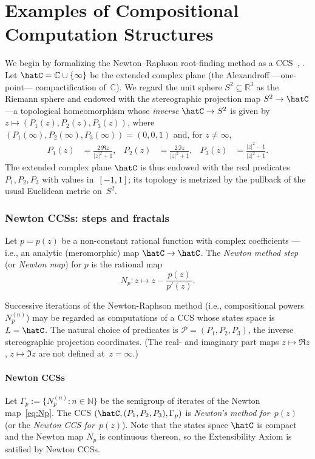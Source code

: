 
\section{Examples of Compositional Computation Structures}\label{sec:examples_CSS}

We begin by formalizing the Newton--Raphson root-finding method as a CCS~\cite{Galantai200025}, \cite[Section~2.3]{Burden2016numerical}.
Let $\hatC = \mathbb{C}\cup\{\infty\}$ be the extended complex plane (the Alexandroff —one-point— compactification of~$\mathbb{C}$).
We regard the unit sphere $S^2\subseteq \mathbb{R}^3$ as the Riemann sphere and endowed with the stereographic projection map $S^2\to\hatC$ —a topological homeomorphism whose \emph{inverse} $\hatC\rightarrow S^2$ is given by $z \mapsto (P_1(z), P_2(z), P_3(z))$, where $(P_1(\infty), P_2(\infty), P_3(\infty)) = (0,0,1)$ and, for $z\ne\infty$,
    \begin{align*}
        P_1(z) &= \frac{2\,\Re{z}}{|z|^2+1},&
        P_2(z) &= \frac{2\,\Im{z}}{|z|^2+1},&
        P_3(z) &= \frac{|z|^2-1}{|z|^2+1}.
    \end{align*}
The extended complex plane $\hatC$ is thus endowed with the real predicates $P_1, P_2, P_3$ with values in~$[-1,1]$; its topology is metrized by the pullback of the usual Euclidean metric on~$S^2$.

\subsubsection*{Newton CCSs: steps and fractals}\label{sec:Newton-map}
Let $p = p(z)$ be a non-constant rational function with complex coefficients —i.e., an analytic (meromorphic) map $\hatC\to\hatC$.
The \emph{Newton method step} (or \emph{Newton map}) for $p$ is the rational map
\begin{equation}\label{eq:Np}
    N_p\colon z \mapsto z-\frac{p(z)}{p'(z)}.
\end{equation}

Successive iterations of the Newton-Raphson method (i.e., compositional powers~$N_p^{(n)}$) may be regarded as computations of a CCS whose states space is $L = \hatC$.
The natural choice of predicates is $\mathcal{P} = (P_1, P_2, P_3)$,
the inverse stereographic projection coordinates.
(The real- and imaginary part maps $z\mapsto\Re{z}$, $z\mapsto\Im{z}$ are not defined at~$z = \infty$.)

\paragraph{Newton CCSs}
\label{sec:Newton-CCS}
Let $\Gamma_p:=\{N_p^{(n)}:n\in\mathbb{N}\}$ be the semigroup of iterates of the Newton map~\eqref{eq:Np}.
The CCS $(\hatC, (P_1,P_2,P_3), \Gamma_p)$ is \emph{Newton's method for~$p(z)$} (or the \emph{Newton CCS for~$p(z)$}).
Note that the states space $\hatC$ is compact and the Newton map $N_p$ is continuous thereon, so the Extensibility Axiom is satified by Newton CCSs.

